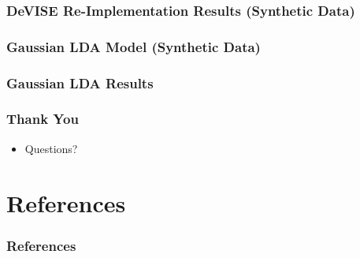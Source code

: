 \documentclass{beamer}
\begin{document}
\begin{frame}
  \frametitle{DeVISE Re-Implementation Results (Synthetic Data)}
\end{frame}

\begin{frame}
  \frametitle{Gaussian LDA Model (Synthetic Data)}
\end{frame}

\begin{frame}
  \frametitle{Gaussian LDA Results}
\end{frame}

\begin{frame}
  \frametitle{Thank You}
  \begin{itemize}
  \item Questions?
  \end{itemize}
\end{frame}

\section{References}
\begin{frame}[t,allowframebreaks]{}
\frametitle{References}
{\small
\printbibliography
\par}
\end{frame}
\end{document}
